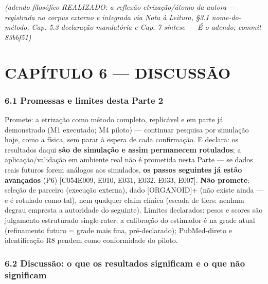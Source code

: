 \documentclass[
  10pt,
]{article}
\begin{document}
\emph{(adendo filosófico REALIZADO: a reflexão etrização/átomo da autora
--- registrada no corpus externo e integrada via Nota à Leitura, §3.1
nome-do-método, Cap. 5.3 declaração mandatória e Cap. 7 síntese --- É o
adendo; commit 83bbf51)}

\hypertarget{capuxedtulo-6-discussuxe3o}{%
\section{CAPÍTULO 6 --- DISCUSSÃO}\label{capuxedtulo-6-discussuxe3o}}

\hypertarget{promessas-e-limites-desta-parte-2}{%
\subsubsection{6.1 Promessas e limites desta Parte
2}\label{promessas-e-limites-desta-parte-2}}

Promete: a etrização como método completo, replicável e em parte já
demonstrado (M1 executado; M4 piloto) --- continuar pesquisa por
simulação hoje, como a física, sem parar à espera de cada confirmação. E
declara: os resultados daqui \textbf{são de simulação e assim permanecem
rotulados}; a aplicação/validação em ambiente real não é prometida nesta
Parte --- se dados reais futuros forem análogos aos simulados,
\textbf{os passos seguintes já estão avançados} (P6)
{[}C054\textbar E009, E010, E031, E032, E033, E007{]}. \textbf{Não
promete}: seleção de parceiro (execução externa), dado {[}ORGANOID{]}+
(não existe ainda --- e é rotulado como tal), nem qualquer claim clínica
(escada de tiers: nenhum degrau empresta a autoridade do seguinte).
Limites declarados: pesos e scores são julgamento estruturado
single-rater; a calibração do estimador é na grade atual (refinamento
futuro = grade mais fina, pré-declarado); PubMed-direto e identificação
R8 pendem como conformidade do piloto.

\hypertarget{discussuxe3o-o-que-os-resultados-significam-e-o-que-nuxe3o-significam}{%
\subsubsection{6.2 Discussão: o que os resultados significam e o que não
significam}\label{discussuxe3o-o-que-os-resultados-significam-e-o-que-nuxe3o-significam}}
\end{document}
